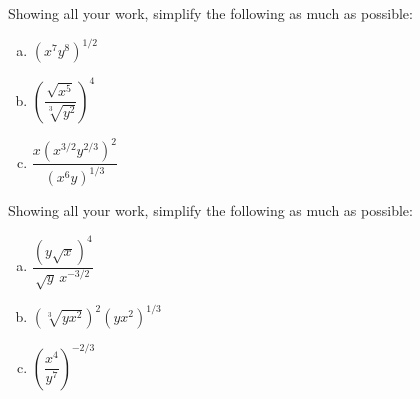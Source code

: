 \documentclass[11pt,letterpaper]{article}
\begin{document}
\prob Showing all your work, simplify the following as much as possible:
        \begin{enumerate}[(a)]
        \item $(x^7 y^8)^{1/2}$
        \item $\left( \dfrac{\sqrt{x^5}}{\sqrt[3]{y^2}} \right)^4$
        \item $\dfrac{x(x^{3/2}y^{2/3})^2}{(x^6 y)^{1/3}}$
        \end{enumerate} \pspace


\prob  Showing all your work, simplify the following as much as possible:
        \begin{enumerate}[(a)]
        \item $\dfrac{(y \sqrt{x})^4}{\sqrt{y}\, x^{-3/2}}$
        \item $(\sqrt[3]{y x^2})^2 (yx^2)^{1/3}$
        \item $\left( \dfrac{x^4}{y^7} \right)^{-2/3}$
        \end{enumerate} \pspace
\end{document}
